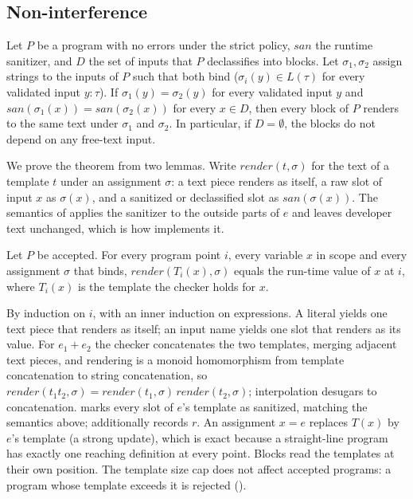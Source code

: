 \documentclass[journal]{IEEEtran}
\begin{document}
\subsection{Non-interference}
\begin{theorem}\label{thm:ni}
Let $P$ be a program with no errors under the strict policy, $\mathit{san}$ the runtime sanitizer, and $D$ the set of inputs that $P$ declassifies into  blocks. Let $\sigma_1,\sigma_2$ assign strings to the inputs of $P$ such that both bind ($\sigma_i(y)\in L(\tau)$ for every validated input $y{:}\tau$). If $\sigma_1(y)=\sigma_2(y)$ for every validated input $y$ and $\mathit{san}(\sigma_1(x)) = \mathit{san}(\sigma_2(x))$ for every $x\in D$, then every  block of $P$ renders to the same text under $\sigma_1$ and $\sigma_2$. In particular, if $D=\emptyset$, the  blocks do not depend on any free-text input.
\end{theorem}

We prove the theorem from two lemmas. Write $\mathit{render}(t,\sigma)$ for the text of a template $t$ under an assignment $\sigma$: a text piece renders as itself, a raw slot of input $x$ as $\sigma(x)$, and a sanitized or declassified slot as $\mathit{san}(\sigma(x))$. The semantics of  applies the sanitizer to the outside parts of $e$ and leaves developer text unchanged, which is how  implements it.

\begin{lemma}[Exactness]\label{lem:exact}
Let $P$ be accepted. For every program point $i$, every variable $x$ in scope and every assignment $\sigma$ that binds, $\mathit{render}(T_i(x),\sigma)$ equals the run-time value of $x$ at $i$, where $T_i(x)$ is the template the checker holds for $x$.
\end{lemma}
\begin{IEEEproof}
By induction on $i$, with an inner induction on expressions. A literal yields one text piece that renders as itself; an input name yields one slot that renders as its value. For $e_1 + e_2$ the checker concatenates the two templates, merging adjacent text pieces, and rendering is a monoid homomorphism from template concatenation to string concatenation, so $\mathit{render}(t_1 t_2,\sigma)=\mathit{render}(t_1,\sigma)\,\mathit{render}(t_2,\sigma)$; interpolation desugars to concatenation.  marks every slot of $e$'s template as sanitized, matching the semantics above;  additionally records $r$. An assignment $x = e$ replaces $T(x)$ by $e$'s template (a strong update), which is exact because a straight-line program has exactly one reaching definition at every point. Blocks read the templates at their own position. The template size cap does not affect accepted programs: a program whose template exceeds it is rejected ().
\end{IEEEproof}
\end{document}
